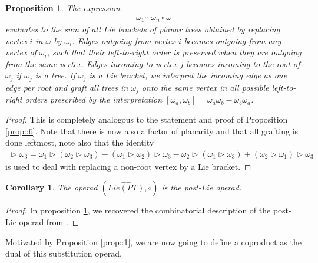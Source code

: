 \documentclass[10pt,a4paper]{article}
\newtheorem{corollary}{Corollary}[theorem]
\newtheorem{proposition}[theorem]{Proposition}
\DeclareMathOperator{\graft}{\triangleright}
\begin{document}
\begin{proposition} \label{prop::3}
The expression
\begin{align*}
\omega_1 \cdots \omega_n \circ \omega
\end{align*}
evaluates to the sum of all Lie brackets of planar trees obtained by replacing vertex $i$ in $\omega$ by $\omega_i$. Edges outgoing from vertex $i$ becomes outgoing from any vertex of $\omega_i$, such that their left-to-right order is preserved when they are outgoing from the same vertex. Edges incoming to vertex $j$ becomes incoming to the root of $\omega_j$ if $\omega_j$ is a tree. If $\omega_j$ is a Lie bracket, we interpret the incoming edge as one edge per root and graft all trees in $\omega_j$ onto the same vertex in all possible left-to-right orders prescribed by the interpretation $[\omega_a,\omega_b]=\omega_a\omega_b-\omega_b\omega_a$.
\end{proposition}
\begin{proof}
This is completely analogous to the statement and proof of Proposition \ref{prop::6}. Note that there is now also a factor of planarity and that all grafting is done leftmost, note also that the identity
\begin{align*}
[\omega_1,\omega_2] \graft \omega_3 = \omega_1 \graft (\omega_2 \graft \omega_3) - (\omega_1 \graft \omega_2) \graft \omega_3 - \omega_2 \graft (\omega_1 \graft \omega_3) + (\omega_2 \graft \omega_1) \graft \omega_3
\end{align*}
is used to deal with replacing a non-root vertex by a Lie bracket.
\end{proof}

\begin{corollary}
The operad $(\hat{Lie(PT)},\circ)$ is the post-Lie operad.
\end{corollary}
\begin{proof}
In proposition \ref{prop::3}, we recovered the combinatorial description of the post-Lie operad from \cite{Silva2018}.
\end{proof}

Motivated by Proposition \ref{prop::1}, we are now going to define a coproduct as the dual of this substitution operad.
\end{document}
